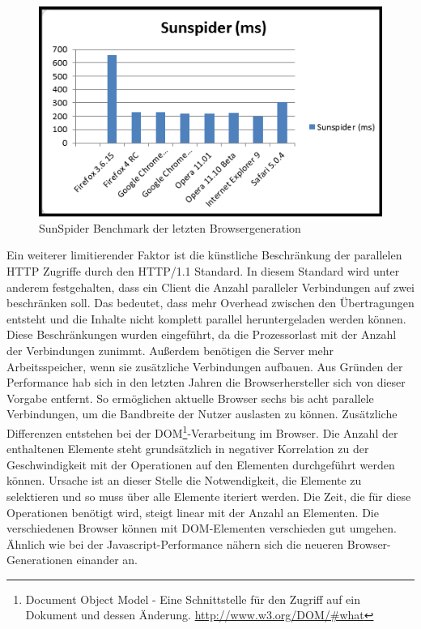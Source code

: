 \begin{figure}[!ht]
  \centering
  \includegraphics[width=1.1\textwidth]{material/sunspiderbenchmark.png}
  \caption{SunSpider Benchmark der letzten Browsergeneration}
  \label{fig:sunspider}
\end{figure}
Ein weiterer limitierender Faktor ist die künstliche Beschränkung der parallelen HTTP Zugriffe durch den HTTP/1.1 Standard. In diesem Standard wird unter anderem festgehalten, dass ein Client die Anzahl paralleler Verbindungen auf zwei beschränken soll. \citep{Fielding2009}
Das bedeutet, dass mehr Overhead zwischen den Übertragungen entsteht und die Inhalte nicht komplett parallel heruntergeladen werden k\"onnen. Diese Beschränkungen wurden eingeführt, da die Prozessorlast mit der Anzahl der Verbindungen zunimmt. Außerdem benötigen die Server mehr Arbeitsspeicher, wenn sie zusätzliche Verbindungen aufbauen. Aus Gr\"unden der Performance hab sich in den letzten Jahren die Browserhersteller sich von dieser Vorgabe entfernt. So ermöglichen aktuelle Browser sechs bis acht parallele Verbindungen, um die Bandbreite der Nutzer auslasten zu können. Zus\"atzliche Differenzen entstehen bei der DOM\footnote{Document Object Model - Eine Schnittstelle f\"ur den Zugriff auf ein Dokument und dessen \"Anderung. \url{http://www.w3.org/DOM/\#what}}-Verarbeitung im Browser. Die Anzahl der enthaltenen Elemente steht grunds\"atzlich in negativer Korrelation zu der Geschwindigkeit mit der Operationen auf den Elementen durchgef\"uhrt werden k\"onnen. Ursache ist an dieser Stelle die Notwendigkeit, die Elemente zu selektieren und so muss \"uber alle Elemente iteriert werden. Die Zeit, die f\"ur diese Operationen ben\"otigt wird, steigt linear mit der Anzahl an Elementen.\citep{YahooDevNetwork2011}
Die verschiedenen Browser k\"onnen mit DOM-Elementen verschieden gut umgehen. \"Ahnlich wie bei der Javascript-Performance n\"ahern sich die neueren Browser-Generationen einander an.

